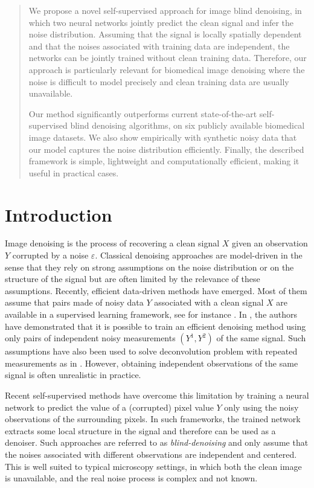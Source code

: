 \documentclass{article}
\begin{document}
\begin{abstract}
We propose a novel self-supervised approach for image blind denoising, in which two neural networks jointly predict the clean signal and infer the noise distribution.
Assuming that the signal is locally spatially dependent and that the noises associated with training data are independent, the networks can be jointly trained without clean training data. Therefore, our approach is  particularly relevant for biomedical image denoising where the noise is difficult to model precisely and clean training data are usually unavailable.

Our method significantly outperforms current state-of-the-art self-supervised blind denoising algorithms, on six publicly available biomedical image datasets. We also show empirically with synthetic noisy data that our model captures the noise distribution efficiently. Finally, the described framework is simple, lightweight and computationally efficient, making it useful in practical cases.
\end{abstract}

\section{Introduction}
\label{sec:introduction}

Image denoising is the process of recovering a clean signal $X$ given an observation $Y$ corrupted by a noise $\varepsilon$. Classical denoising approaches  are model-driven in the sense that they rely on strong assumptions on the noise distribution or on the structure of the signal but are often  limited by the relevance of these assumptions.
Recently, efficient data-driven methods have emerged. Most of them assume that pairs made of noisy data $Y$ associated with a clean signal $X$ are available in a supervised learning framework, see for instance \cite{weigert2017content}. In \cite{lehtinen2018noise2noise}, the authors have demonstrated that it is possible to train an efficient denoising method using only pairs of independent noisy measurements $(Y^1, Y^2)$ of the same signal. Such assumptions have also been used to solve deconvolution problem with repeated measurements as in \cite{delaigle2008deconvolution}. However, obtaining  independent observations of the same signal is often unrealistic in practice.

Recent self-supervised methods have overcome this limitation \cite{batson2019noise2self,krull2018noise2void} by training a neural network to predict the value of a (corrupted) pixel value $Y$ only using the noisy observations of the surrounding pixels. In such frameworks, the trained network extracts some local structure in the signal and therefore can be used as a denoiser. Such approaches are referred to as \textit{blind-denoising}  and only assume that the noises associated with different observations are independent and centered. This is well suited to typical microscopy settings, in which both the clean image is unavailable, and the real noise process is complex and not known.
\end{document}
